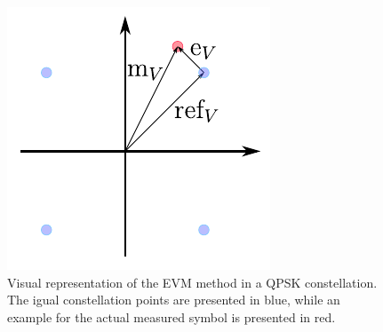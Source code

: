 \begin{refsection}
\begin{figure}[h]
\centering
\includegraphics{./lib/error_vector_magnitude/figures/evm.pdf}
\caption{Visual representation of the EVM method in a QPSK constellation. The igual constellation points are presented in blue, while an example for the actual measured symbol is presented in red.}
\label{fig:EVM}
\end{figure}


\clearpage
\printbibliography[heading=subbibliography]
\end{refsection}
\cleardoublepage
